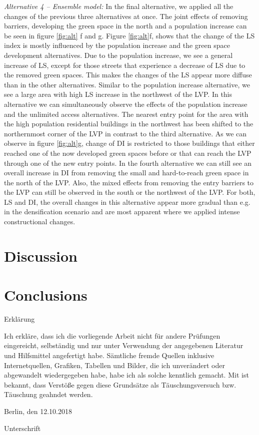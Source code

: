 \documentclass[10pt]{article}
\begin{document}
\textit{Alternative 4 – Ensemble model:} In the final alternative, we applied all the changes of the previous three alternatives at once. 
The joint effects of removing barriers, developing the green space in the north and a population increase can be seen in figure \ref{fig:alt} f and g.
Figure \ref{fig:alt}f, shows that the change of the LS index is mostly influenced by the population increase and the green space development alternatives.
Due to the population increase, we see a general increase of LS, except for those streets that experience a decrease of LS due to the removed green spaces.
This makes the changes of the LS appear more diffuse than in the other alternatives.
Similar to the population increase alternative, we see a large area with high LS increase in the northwest of the LVP.
In this alternative we can simultaneously observe the effects of the population increase and the unlimited access alternatives.
The nearest entry point for the area with the high population residential buildings in the northwest has been shifted to the northernmost corner of the LVP in contrast to the third alternative.
As we can observe in figure \ref{fig:alt}g, change of DI is restricted to those buildings that either reached one of the now developed green spaces before or that can reach the LVP through one of the new entry points.
In the fourth alternative we can still see an overall increase in DI from removing the small and hard-to-reach green space in the north of the LVP.
Also, the mixed effects from removing the entry barriers to the LVP can still be observed in the south or the northwest of the LVP. 
For both, LS and DI, the overall changes in this alternative appear more gradual than e.g. in the densification scenario and are most apparent where we applied intense constructional changes.  



\section{Discussion}


\section{Conclusions}



%

\onecolumn
\newpage
Erkl\"arung

Ich erkl\"are, dass ich die vorliegende Arbeit nicht f\"ur andere Pr\"ufungen eingereicht, selbst\"andig und nur unter Verwendung der angegebenen Literatur und Hilfsmittel angefertigt habe. S\"amtliche fremde Quellen inklusive Internetquellen, Grafiken, Tabellen und Bilder, die ich unver\"andert oder abgewandelt wiedergegeben habe, habe ich als solche kenntlich gemacht. Mit ist bekannt, dass Verst\"oße gegen diese Grunds\"atze als T\"auschungsversuch bzw. T\"auschung geahndet werden.

Berlin, den 12.10.2018\\

\par\bigskip
\par\bigskip

Unterschrift
\end{document}
